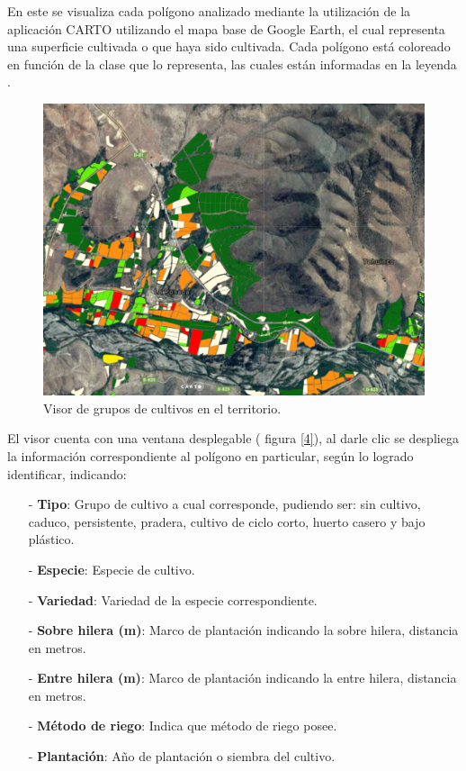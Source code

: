 \documentclass[10pt]{article}
\begin{document}
En este se visualiza cada polígono analizado mediante la utilización de la aplicación CARTO utilizando el mapa base de Google Earth, el cual representa una superficie cultivada o que haya sido cultivada. Cada polígono está coloreado en función de la clase que lo representa, las cuales están informadas en la leyenda .

\begin{figure}[H]
\centering
\includegraphics[scale=0.5]{Figuras_manual/visor.pdf}
\caption{Visor de grupos de cultivos en el territorio.}
\end{figure}

El visor cuenta con una ventana desplegable ( figura \ref{4}), al darle clic se despliega la información correspondiente al polígono en particular, según lo logrado identificar, indicando: 

\begin{itemize}
\item[-]\textbf{Tipo}: Grupo de cultivo a cual corresponde, pudiendo ser: sin cultivo, caduco, persistente, pradera, cultivo de ciclo corto, huerto casero y bajo plástico.
\item[-]\textbf{Especie}: Especie de cultivo.
\item[-]\textbf{Variedad}: Variedad de la especie correspondiente.
\item[-]\textbf{Sobre hilera (m)}: Marco de plantación indicando la sobre hilera, distancia en metros.
\item[-]\textbf{Entre hilera (m)}: Marco de plantación indicando la entre hilera, distancia en metros.
\item[-]\textbf{Método de riego}: Indica que método de riego posee.
\item[-]\textbf{Plantación}: Año de plantación o siembra del cultivo.
\end{itemize}
\end{document}
